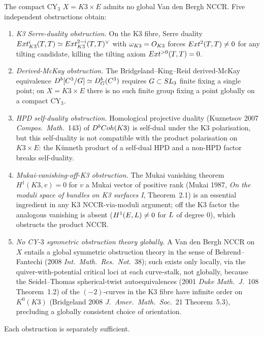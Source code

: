 \begin{theorem}
\label{gluing:thm:five-obstructions-NCCR}
The compact CY$_3$ $X = K3 \times E$ admits no global Van den Bergh
NCCR. Five independent obstructions obtain:
\begin{enumerate}[label=\textup{(\alph*)}]
 \item \emph{K3 Serre-duality obstruction.} On the K3 fibre, Serre
 duality $Ext^i_{K3}(T, T) \simeq Ext^{2-i}_{K3}(T, T)^{\vee}$ with
 $\omega_{K3} = O_{K3}$ forces $Ext^2(T, T) \neq 0$ for any
 tilting candidate, killing the tilting axiom
 $Ext^{>0}(T, T) = 0$.
 \item \emph{Derived-McKay obstruction.} The Bridgeland--King--Reid
 derived-McKay equivalence $D^b[C^3/G] \simeq D^b_G(C^3)$ requires
 $G \subset SL_3$ finite fixing a single point; on $X = K3 \times E$
 there is no such finite group fixing a point globally on a compact
 CY$_3$.
 \item \emph{HPD self-duality obstruction.} Homological projective
 duality (Kuznetsov 2007 \emph{Compos.\ Math.}~143) of $D^bCoh(K3)$
 is self-dual under the K3 polarisation, but this self-duality is
 not compatible with the product polarisation on $K3 \times E$:
 the K\"unneth product of a self-dual HPD and a non-HPD factor
 breaks self-duality.
 \item \emph{Mukai-vanishing-off-K3 obstruction.} The Mukai
 vanishing theorem $H^1(K3, v) = 0$ for $v$ a Mukai vector of
 positive rank (Mukai 1987, \emph{On the moduli space of bundles on
 K3 surfaces I}, Theorem~2.1) is an essential ingredient in any
 K3 NCCR-via-moduli argument; off the K3 factor the analogous
 vanishing is absent ($H^1(E, L) \neq 0$ for $L$ of degree $0$),
 which obstructs the product NCCR.
 \item \emph{No CY-$3$ symmetric obstruction theory globally.}
 A Van den Bergh NCCR on $X$ entails a global symmetric
 obstruction theory in the sense of Behrend--Fantechi (2008
 \emph{Int.\ Math.\ Res.\ Not.}~38); such exists only locally,
 via the quiver-with-potential critical loci at each curve-stalk,
 not globally, because the Seidel--Thomas spherical-twist
 autoequivalences (2001 \emph{Duke Math.\ J.}~108 Theorem~1.2) of
 the $(-2)$-curves in the K3 fibre have infinite order on
 $K^0(K3)$ (Bridgeland 2008 \emph{J.\ Amer.\ Math.\ Soc.}~21
 Theorem~5.3), precluding a globally consistent choice of
 orientation.
\end{enumerate}
Each obstruction is separately sufficient.
\end{theorem}

